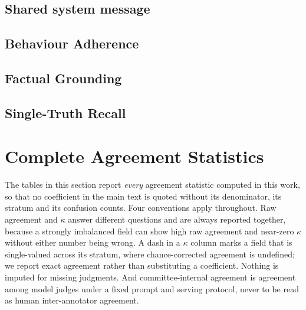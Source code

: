 \subsection{Shared system message}

\subsection{Behaviour Adherence}

\subsection{Factual Grounding}

\subsection{Single-Truth Recall}

\FloatBarrier

\section{Complete Agreement Statistics}
\label{app:allagreement}

The tables in this section report \emph{every} agreement statistic computed in
this work, so that no coefficient in the main text is quoted without its
denominator, its stratum and its confusion counts. Four conventions apply
throughout. Raw agreement and $\kappa$ answer different questions and are always
reported together, because a strongly imbalanced field can show high raw
agreement and near-zero $\kappa$ without either number being wrong. A dash in a
$\kappa$ column marks a field that is single-valued across its stratum, where
chance-corrected agreement is undefined; we report exact agreement rather than
substituting a coefficient. Nothing is imputed for missing judgments. And
committee-internal agreement is agreement among model judges under a fixed
prompt and serving protocol, never to be read as human inter-annotator agreement.

